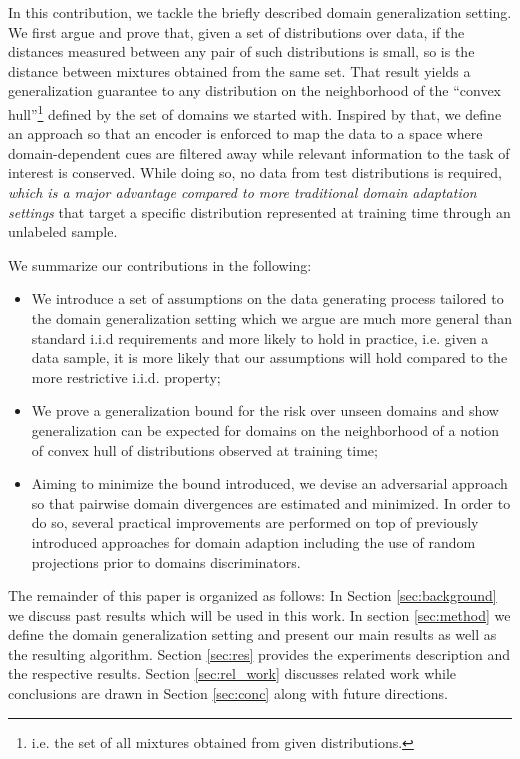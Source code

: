 \documentclass{article}
\begin{document}
In this contribution, we tackle the briefly described domain generalization setting. We first argue and prove that, given a set of distributions over data, if the distances measured between any pair of such distributions is small, so is the distance between mixtures obtained from the same set. That result yields a generalization guarantee to any distribution on the neighborhood of the ``convex hull''\footnote{i.e. the set of all mixtures obtained from given distributions.} defined by the set of domains we started with. Inspired by that, we define an approach so that an encoder is enforced to map the data to a space where domain-dependent cues are filtered away while relevant information to the task of interest is conserved. While doing so, no data from test distributions is required, \emph{which is a major advantage compared to more traditional domain adaptation settings} that target a specific distribution represented at training time through an unlabeled sample.

We summarize our contributions in the following:
\begin{itemize}
    \item We introduce a set of assumptions on the data generating process tailored to the domain generalization setting which we argue are much more general than standard i.i.d requirements and more likely to hold in practice, i.e. given a data sample, it is more likely that our assumptions will hold compared to the more restrictive i.i.d. property;
    \item We prove a generalization bound for the risk over unseen domains and show generalization can be expected for domains on the neighborhood of a notion of convex hull of distributions observed at training time;
    \item Aiming to minimize the bound introduced, we devise an adversarial approach so that pairwise domain divergences are estimated and minimized. In order to do so, several practical improvements are performed on top of previously introduced approaches for domain adaption including the use of random projections prior to domains discriminators. \end{itemize}

The remainder of this paper is organized as follows: In Section \ref{sec:background} we discuss past results which will be used in this work. In section \ref{sec:method} we define the domain generalization setting and present our main results as well as the resulting algorithm. Section \ref{sec:res} provides the experiments description and the respective results. Section \ref{sec:rel_work} discusses related work while conclusions are drawn in Section \ref{sec:conc} along with future directions.
\end{document}
